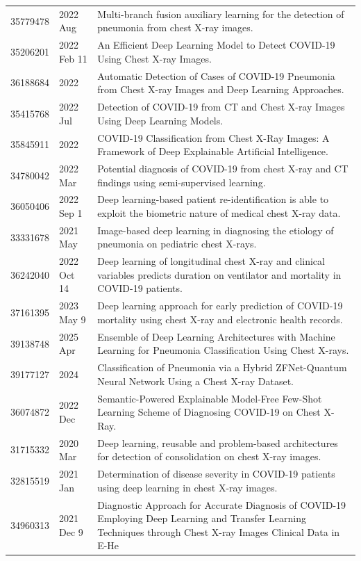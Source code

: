 \begin{longtable}{llp{9.5cm}}
35779478 & 2022 Aug & Multi-branch fusion auxiliary learning for the detection of pneumonia from chest X-ray images. \\
35206201 & 2022 Feb 11 & An Efficient Deep Learning Model to Detect COVID-19 Using Chest X-ray Images. \\
36188684 & 2022 & Automatic Detection of Cases of COVID-19 Pneumonia from Chest X-ray Images and Deep Learning Approaches. \\
35415768 & 2022 Jul & Detection of COVID-19 from CT and Chest X-ray Images Using Deep Learning Models. \\
35845911 & 2022 & COVID-19 Classification from Chest X-Ray Images: A Framework of Deep Explainable Artificial Intelligence. \\
34780042 & 2022 Mar & Potential diagnosis of COVID-19 from chest X-ray and CT findings using semi-supervised learning. \\
36050406 & 2022 Sep 1 & Deep learning-based patient re-identification is able to exploit the biometric nature of medical chest X-ray data. \\
33331678 & 2021 May & Image-based deep learning in diagnosing the etiology of pneumonia on pediatric chest X-rays. \\
36242040 & 2022 Oct 14 & Deep learning of longitudinal chest X-ray and clinical variables predicts duration on ventilator and mortality in COVID-19 patients. \\
37161395 & 2023 May 9 & Deep learning approach for early prediction of COVID-19 mortality using chest X-ray and electronic health records. \\
39138748 & 2025 Apr & Ensemble of Deep Learning Architectures with Machine Learning for Pneumonia Classification Using Chest X-rays. \\
39177127 & 2024 & Classification of Pneumonia via a Hybrid ZFNet-Quantum Neural Network Using a Chest X-ray Dataset. \\
36074872 & 2022 Dec & Semantic-Powered Explainable Model-Free Few-Shot Learning Scheme of Diagnosing COVID-19 on Chest X-Ray. \\
31715332 & 2020 Mar & Deep learning, reusable and problem-based architectures for detection of consolidation on chest X-ray images. \\
32815519 & 2021 Jan & Determination of disease severity in COVID-19 patients using deep learning in chest X-ray images. \\
34960313 & 2021 Dec 9 & Diagnostic Approach for Accurate Diagnosis of COVID-19 Employing Deep Learning and Transfer Learning Techniques through Chest X-ray Images Clinical Data in E-He \\

\end{longtable}
